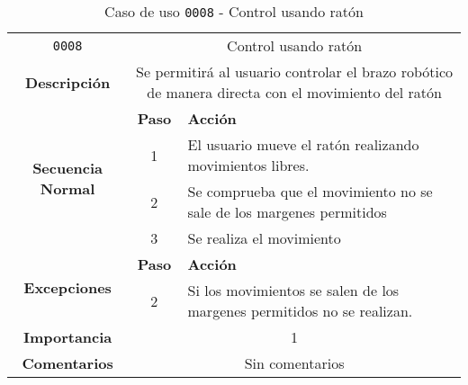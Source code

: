 \begin{table}[H]
    \centering
    \begin{tabularx}{\textwidth}{|c|c|X|}
        \cline{1-3}
        \texttt{0008}        & \multicolumn{2}{c|}{Control usando ratón}                                      
        \\ \cline{1-3}
        \textbf{Descripción} & \multicolumn{2}{m{13cm}|}{Se permitirá al usuario controlar el brazo robótico de manera directa con el movimiento del ratón}
        \\ \cline{1-3}
        \multirow{4}{*}{\textbf{Secuencia Normal}} & \textbf{Paso} & \textbf{Acción}
        \\ \cline{2-3}                    &   1  & El usuario mueve el ratón realizando movimientos libres.
        \\ \cline{2-3}                    &   2  & Se comprueba que el movimiento no se sale de los margenes permitidos
        \\ \cline{2-3}                    &   3  & Se realiza el movimiento
        \\ \cline{1-3}
        \multirow{2}{*}{\textbf{Excepciones}} & \textbf{Paso} & \textbf{Acción}
        \\ \cline{2-3}                    &   2   &  Si los movimientos se salen de los margenes permitidos no se realizan.
        \\ \cline{1-3}
        \textbf{Importancia}                 & \multicolumn{2}{c|}{1}           
        \\ \cline{1-3}
        \textbf{Comentarios}                 & \multicolumn{2}{c|}{Sin comentarios}
        \\ \cline{1-3}
    \end{tabularx}
    \caption{Caso de uso \texttt{0008} - Control usando ratón}
    \label{tab:CU0008}
    \label{tab:caso_de_uso_control_usando_ratón}
\end{table}


